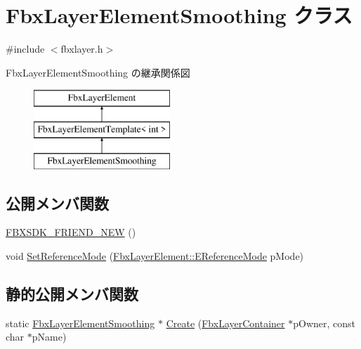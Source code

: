 \hypertarget{class_fbx_layer_element_smoothing}{}\section{Fbx\+Layer\+Element\+Smoothing クラス}
\label{class_fbx_layer_element_smoothing}


{\ttfamily \#include $<$fbxlayer.\+h$>$}

Fbx\+Layer\+Element\+Smoothing の継承関係図\begin{figure}[H]
\begin{center}
\leavevmode
\includegraphics[height=3.000000cm]{class_fbx_layer_element_smoothing}
\end{center}
\end{figure}
\subsection*{公開メンバ関数}
\begin{DoxyCompactItemize}
\item 
\hyperlink{class_fbx_layer_element_smoothing_aea45577e6b6315795adeaf801538b5ab}{F\+B\+X\+S\+D\+K\+\_\+\+F\+R\+I\+E\+N\+D\+\_\+\+N\+EW} ()
\item 
void \hyperlink{class_fbx_layer_element_smoothing_a8c17c1dad55d4a42648c6f40337dd8c5}{Set\+Reference\+Mode} (\hyperlink{class_fbx_layer_element_a00f04654580ca9b2f5d292c11abd83fc}{Fbx\+Layer\+Element\+::\+E\+Reference\+Mode} p\+Mode)
\end{DoxyCompactItemize}
\subsection*{静的公開メンバ関数}
\begin{DoxyCompactItemize}
\item 
static \hyperlink{class_fbx_layer_element_smoothing}{Fbx\+Layer\+Element\+Smoothing} $\ast$ \hyperlink{class_fbx_layer_element_smoothing_afdb42053590ce288c60e5539a0b2d875}{Create} (\hyperlink{class_fbx_layer_container}{Fbx\+Layer\+Container} $\ast$p\+Owner, const char $\ast$p\+Name)
\end{DoxyCompactItemize}
